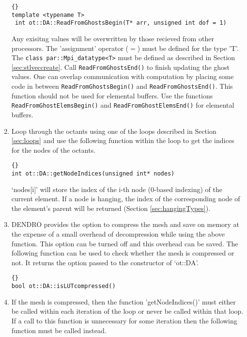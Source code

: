 \documentclass[10pt,reqno,a4paper]{report}
\numberwithin{equation}{section}
\begin{document}
\begin{enumerate}
\begin{lstlisting}[frame=trbl, fontadjust]{}
template <typename T>
 int ot::DA::ReadFromGhostsBegin(T* arr, unsigned int dof = 1)
\end{lstlisting}

Any exisitng values will be overwritten by those recieved from other processors. The 'assignment' operator ($=$) must be defined for the type 'T'.
The \lstinline[basicstyle=\bfseries]!class par::Mpi_datatype<T>! must be defined as described in Section \ref{sec:stlveccreate}. Call \lstinline[basicstyle=\bfseries]!ReadFromGhostsEnd()! to finish updating the ghost values. One can overlap communication with computation by placing
 some code in between \lstinline[basicstyle=\bfseries]!ReadFromGhostsBegin()! and \lstinline[basicstyle=\bfseries]!ReadFromGhostsEnd()!.
  This function should not be used for elemental buffers. Use the functions 
  \lstinline[basicstyle=\bfseries]!ReadFromGhostElemsBegin()! and \lstinline[basicstyle=\bfseries]!ReadFromGhostElemsEnd()! for elemental buffers.

\item Loop through the octants using one of the loops described in Section \ref{sec:loops} and use the following function within the
 loop to get the indices for the nodes of the octants.
 
\begin{lstlisting}[frame=trbl, fontadjust]{}
int ot::DA::getNodeIndices(unsigned int* nodes)
\end{lstlisting}

`nodes$[$i$]$' will store the index of the i-th node (0-based indexing) of the current element. If a node is hanging, the index of the
 corresponding node of the element's parent will be returned (Section \ref{sec:hangingTypes}).
 
\item DENDRO provides the option to compress the mesh and save on memory at the expense of a small overhead of decompression while using the above function. This option can be turned off and this overhead can be saved. The following function can be used to check whether the mesh is compressed or not. It returns the option passed to the constructor of `ot::DA'.

\begin{lstlisting}[frame=trbl, fontadjust]{}
bool ot::DA::isLUTcompressed()
\end{lstlisting}

\item If the mesh is compressed, then the function 'getNodeIndices()' must either be called within each iteration of the loop or never be called within that loop. If a call to this function is unnecessary for some iteration then the following function must be called instead.


\end{enumerate}
\end{document}

